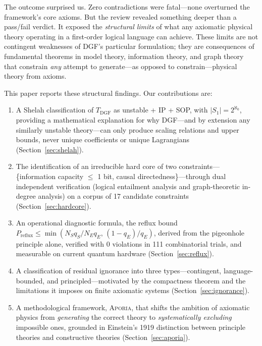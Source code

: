 \documentclass[12pt,a4paper]{article}
\theoremstyle{definition}
\theoremstyle{remark}
\newcommand{\Aporia}{\textsc{Aporia}}
\begin{document}
The outcome surprised us. Zero contradictions were fatal---none overturned the framework's core axioms. But the review revealed something deeper than a pass/fail verdict. It exposed the \emph{structural limits} of what any axiomatic physical theory operating in a first-order logical language can achieve. These limits are not contingent weaknesses of DGF's particular formulation; they are consequences of fundamental theorems in model theory, information theory, and graph theory that constrain \emph{any} attempt to generate---as opposed to constrain---physical theory from axioms.

This paper reports these structural findings. Our contributions are:

\begin{enumerate}[leftmargin=*,itemsep=0pt,topsep=0pt]
\item A Shelah classification of $T_{\mathrm{DGF}}$ as unstable + IP + SOP, with $|S_1|=2^{\aleph_0}$, providing a mathematical explanation for why DGF---and by extension any similarly unstable theory---can only produce scaling relations and upper bounds, never unique coefficients or unique Lagrangians (Section~\ref{sec:shelah}).
\item The identification of an irreducible hard core of two constraints---\{information capacity $\leq$ 1 bit, causal directedness\}---through dual independent verification (logical entailment analysis and graph-theoretic in-degree analysis) on a corpus of 17 candidate constraints (Section~\ref{sec:hardcore}).
\item An operational diagnostic formula, the reflux bound $P_{\mathrm{reflux}}\leq\min(N_S q_S/N_E q_E,\,(1-q_E)/q_E)$, derived from the pigeonhole principle alone, verified with 0 violations in 111 combinatorial trials, and measurable on current quantum hardware (Section~\ref{sec:reflux}).
\item A classification of residual ignorance into three types---contingent, language-bounded, and principled---motivated by the compactness theorem and the limitations it imposes on finite axiomatic systems (Section~\ref{sec:ignorance}).
\item A methodological framework, \Aporia, that shifts the ambition of axiomatic physics from \emph{generating} the correct theory to \emph{systematically excluding} impossible ones, grounded in Einstein's 1919 distinction between principle theories and constructive theories (Section~\ref{sec:aporia}).
\end{enumerate}
\end{document}
